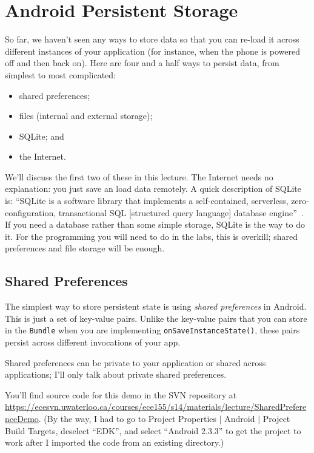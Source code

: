 




\section*{Android Persistent Storage}
So far, we haven't seen any ways to store data so that you can re-load
it across different instances of your application (for instance, when
the phone is powered off and then back on). Here are four and
a half ways to persist data, from simplest to most complicated:
\begin{itemize}
\item shared preferences;
\item files (internal and external storage);
\item SQLite; and
\item the Internet.
\end{itemize}
We'll discuss the first two of these in this lecture. The Internet needs no explanation: you just save an load data remotely. A quick description of SQLite is: ``SQLite is a software library that implements a self-contained, serverless, zero-configuration, transactional SQL [structured query language] database engine''~\cite{sqlite}. If you need a database rather than some simple storage, SQLite is the way to do it. For the programming you will need to do in the labs, this is overkill; shared preferences and file storage will be enough.

\subsection*{Shared Preferences}
The simplest way to store persistent state is using 
\emph{shared preferences} in Android. This is just a set of key-value
pairs. Unlike the key-value pairs that you can store in the {\tt Bundle}
when you are implementing {\tt onSaveInstanceState()}, these pairs persist
across different invocations of your app. 

Shared preferences can be private to your application or shared across
applications; I'll only talk about private shared preferences.

You'll find source code for this demo in the SVN repository at
\url{https://ecesvn.uwaterloo.ca/courses/ece155/s14/materials/lecture/SharedPreferenceDemo}. (By
the way, I had to go to Project Properties $\mid$ Android $\mid$
Project Build Targets, deselect ``EDK'', and select ``Android 2.3.3''
to get the project to work after I imported the code from an existing
directory.)


